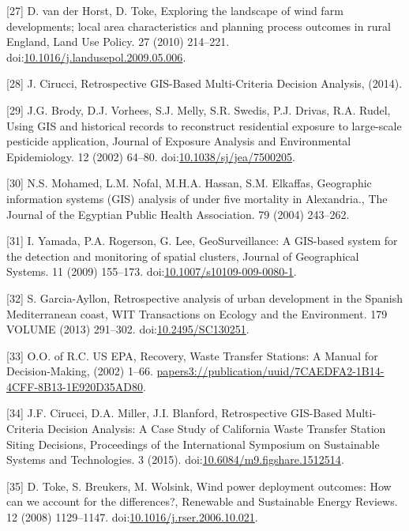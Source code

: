 \documentclass[a4paper,]{article}
\theoremstyle{definition}
\theoremstyle{definition}
\theoremstyle{definition}
\theoremstyle{remark}
\begin{document}
\hypertarget{ref-VanderHorst2010}{}
{[}27{]} D. van der Horst, D. Toke, Exploring the landscape of wind farm
developments; local area characteristics and planning process outcomes
in rural England, Land Use Policy. 27 (2010) 214--221.
doi:\href{https://doi.org/10.1016/j.landusepol.2009.05.006}{10.1016/j.landusepol.2009.05.006}.

\hypertarget{ref-Cirucci2014}{}
{[}28{]} J. Cirucci, Retrospective GIS-Based Multi-Criteria Decision
Analysis, (2014).

\hypertarget{ref-Brody2002}{}
{[}29{]} J.G. Brody, D.J. Vorhees, S.J. Melly, S.R. Swedis, P.J. Drivas,
R.A. Rudel, Using GIS and historical records to reconstruct residential
exposure to large-scale pesticide application, Journal of Exposure
Analysis and Environmental Epidemiology. 12 (2002) 64--80.
doi:\href{https://doi.org/10.1038/sj/jea/7500205}{10.1038/sj/jea/7500205}.

\hypertarget{ref-Mohamed2004}{}
{[}30{]} N.S. Mohamed, L.M. Nofal, M.H.A. Hassan, S.M. Elkaffas,
Geographic information systems (GIS) analysis of under five mortality in
Alexandria., The Journal of the Egyptian Public Health Association. 79
(2004) 243--262.

\hypertarget{ref-Yamada2009}{}
{[}31{]} I. Yamada, P.A. Rogerson, G. Lee, GeoSurveillance: A GIS-based
system for the detection and monitoring of spatial clusters, Journal of
Geographical Systems. 11 (2009) 155--173.
doi:\href{https://doi.org/10.1007/s10109-009-0080-1}{10.1007/s10109-009-0080-1}.

\hypertarget{ref-Garcia-Ayllon2013}{}
{[}32{]} S. Garcia-Ayllon, Retrospective analysis of urban development
in the Spanish Mediterranean coast, WIT Transactions on Ecology and the
Environment. 179 VOLUME (2013) 291--302.
doi:\href{https://doi.org/10.2495/SC130251}{10.2495/SC130251}.

\hypertarget{ref-USEPA2002}{}
{[}33{]} O.O. of R.C. US EPA, Recovery, Waste Transfer Stations: A
Manual for Decision-Making, (2002) 1--66.
\url{papers3://publication/uuid/7CAEDFA2-1B14-4CFF-8B13-1E920D35AD80}.

\hypertarget{ref-Cirucci2015}{}
{[}34{]} J.F. Cirucci, D.A. Miller, J.I. Blanford, Retrospective
GIS-Based Multi-Criteria Decision Analysis: A Case Study of California
Waste Transfer Station Siting Decisions, Proceedings of the
International Symposium on Sustainable Systems and Technologies. 3
(2015).
doi:\href{https://doi.org/10.6084/m9.figshare.1512514}{10.6084/m9.figshare.1512514}.

\hypertarget{ref-Toke2008}{}
{[}35{]} D. Toke, S. Breukers, M. Wolsink, Wind power deployment
outcomes: How can we account for the differences?, Renewable and
Sustainable Energy Reviews. 12 (2008) 1129--1147.
doi:\href{https://doi.org/10.1016/j.rser.2006.10.021}{10.1016/j.rser.2006.10.021}.
\end{document}
